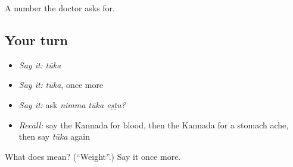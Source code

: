 \begin{grammarlens}[title={What you've built}]
A number the doctor asks for.
\end{grammarlens}

\subsection*{Your turn}
\begin{itemize}
\raggedright
  \item \emph{Say it:} \emph{tūka}
  \item \emph{Say it:} \emph{tūka}, once more
  \item \emph{Say it:} ask \emph{nimma tūka eṣṭu?}
  \item \emph{Recall:} say the Kannada for blood, then the Kannada for a stomach ache, then say \emph{tūka} again
\end{itemize}

\begin{tcolorbox}[breakable,colback=teal!4,colframe=teal!35!black,title={Before you move on}]
What does  mean? (\textquotedblleft{}Weight\textquotedblright{}.) Say it once more.
\end{tcolorbox}
